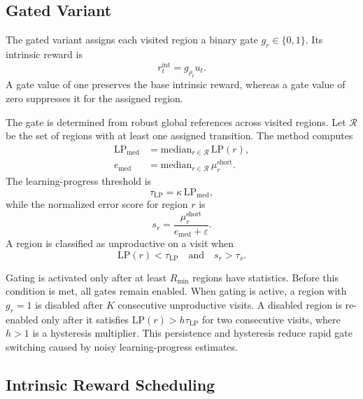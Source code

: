 \subsection{Gated Variant}
\label{subsec:methodology_gated_variant}

The gated variant assigns each visited region a binary gate $g_r\in\{0,1\}$.
Its intrinsic reward is
\begin{equation}
    r_t^{\mathrm{int}}=g_{\rho_t}u_t.
\end{equation}
A gate value of one preserves the base intrinsic reward, whereas a gate value of zero suppresses it for the assigned region.

The gate is determined from robust global references across visited regions.
Let $\mathcal{R}$ be the set of regions with at least one assigned transition.
The method computes
\begin{align}
    \mathrm{LP}_{\mathrm{med}}
    &= \mathrm{median}_{r\in\mathcal{R}}\,\mathrm{LP}(r), \\
    e_{\mathrm{med}}
    &= \mathrm{median}_{r\in\mathcal{R}}\,\mu_r^{\mathrm{short}}.
\end{align}
The learning-progress threshold is
\begin{equation}
    \tau_{\mathrm{LP}}=\kappa\,\mathrm{LP}_{\mathrm{med}},
\end{equation}
while the normalized error score for region $r$ is
\begin{equation}
    s_r=\frac{\mu_r^{\mathrm{short}}}{e_{\mathrm{med}}+\varepsilon}.
\end{equation}
A region is classified as unproductive on a visit when
\begin{equation}
    \mathrm{LP}(r)<\tau_{\mathrm{LP}}
    \quad\text{and}\quad
    s_r>\tau_s.
\end{equation}

Gating is activated only after at least $R_{\min}$ regions have statistics.
Before this condition is met, all gates remain enabled.
When gating is active, a region with $g_r=1$ is disabled after $K$ consecutive unproductive visits.
A disabled region is re-enabled only after it satisfies $\mathrm{LP}(r)>h\tau_{\mathrm{LP}}$ for two consecutive visits, where $h>1$ is a hysteresis multiplier.
This persistence and hysteresis reduce rapid gate switching caused by noisy learning-progress estimates.

\subsection{Intrinsic Reward Scheduling}
\label{subsec:methodology_intrinsic_reward_scheduling}

